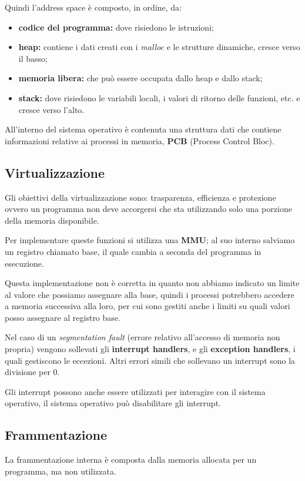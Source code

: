 Quindi l'address space è composto, in ordine, da:
\begin{itemize}
  \item \textbf{codice del programma:} dove risiedono le istruzioni;
  \item \textbf{heap:} contiene i dati creati con i \emph{malloc} e le
    strutture dinamiche, cresce verso il basso;
  \item \textbf{memoria libera:} che può essere occupata dallo heap e dallo
    stack;
  \item \textbf{stack:} dove risiedono le variabili locali, i valori di ritorno
    delle funzioni, etc. e cresce verso l'alto.
\end{itemize}


All'interno del sistema operativo è contenuta una struttura dati che contiene
informazioni relative ai processi in memoria, \textbf{PCB} (Process Control
Bloc).

\subsection{Virtualizzazione}
Gli obiettivi della virtualizzazione sono: trasparenza, efficienza e protezione
ovvero un programma non deve accorgersi che sta utilizzando solo una porzione
della memoria disponibile.


Per implementare queste funzioni si utilizza una \textbf{MMU}; al suo interno
salviamo un registro chiamato base, il quale cambia a seconda del programma
in esecuzione.

Questa implementazione non è corretta in quanto non abbiamo indicato un limite
al valore che possiamo assegnare alla base, quindi i processi potrebbero
accedere a memoria successiva alla loro, per cui sono gestiti anche i limiti
su quali valori posso assegnare al registro base.

Nel caso di un \textit{segmentation fault} (errore relativo all'accesso di
memoria non propria) vengono sollevati gli \textbf{interrupt handlers}, e gli
\textbf{exception handlers}, i quali gestiscono le eccezioni.
Altri errori simili che sollevano un interrupt sono la divisione per $0$.

Gli interrupt possono anche essere utilizzati per interagire con il sistema
operativo, il sistema operativo può disabilitare gli interrupt.

\subsection{Frammentazione}
La frammentazione interna è composta dalla memoria allocata per un programma,
ma non utilizzata.

